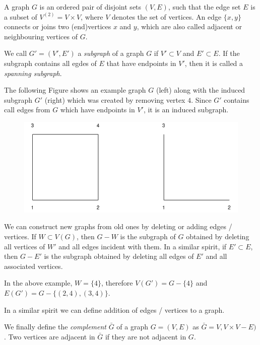 
A graph $G$ is an ordered pair of disjoint sets $(V,E)$, such that the edge set $E$ is a subset of $V^{(2)} = V \times V$, where $V$ denotes the set of vertices. An edge $\{x,y\}$ connects or joins two (end)vertices $x$ and $y$, which are also called adjacent or neighbouring vertices of $G$.

We call $G' = (V', E')$ a \emph{subgraph} of a graph $G$ if $V' \subset V$ and $E' \subset E$. If the subgraph contains all egdes of $E$ that have endpoints in $V'$, then it is called a \emph{spanning subgraph}.

The following Figure shows an example graph $G$ (left) along with the induced subgraph $G'$ (right) which was created by removing vertex $4$. Since $G'$ contains call edges from $G$ which have endpoints in $V'$, it is an induced subgraph.

\begin{figure}[H]
\centering
\includegraphics[scale=0.5]{images/graphs_03_01.png}
\end{figure}

We can construct new graphs from old ones by deleting or adding edges / vertices. If $W \subset V(G)$, then $G - W$ is the subgraph of $G$ obtained by deleting all vertices of $W'$ and all edges incident with them. In a similar spirit, if $E' \subset E$, then $G - E'$ is the subgraph obtained by deleting all edges of $E'$ and all associated vertices.

In the above example, $W = \{4\}$, therefore $V(G') = G - \{4\}$ and $E(G') = G - \{(2,4), (3,4)\}$.

In a similar spirit we can define addition of edges / vertices to a graph.

We finally define the \emph{complement} $\bar{G}$ of a graph $G = (V,E)$ as $\bar{G} = V, V \times V - E)$. Two vertices are adjacent in $\bar{G}$ if they are not adjacent in $G$.

